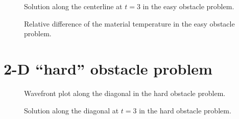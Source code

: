 \begin{figure}[htb]
  \centering
  \label{fig:easymkContour}
\end{figure}

\begin{figure}[htb]
  \centering
  \caption{Solution along the centerline at $t=3$ in the easy obstacle
  problem.}
  \label{fig:easymkCenterline}
\end{figure}

\begin{figure}[htb]
  \centering
  
  \caption{Relative difference of the material temperature in the easy obstacle
  problem.}
  \label{fig:easymkConvergence}
\end{figure}

\section{2-D \texorpdfstring{``hard''}{hard} obstacle problem}

\begin{figure}[htb]
  \centering
  
  \caption{Wavefront plot along the diagonal in the hard obstacle problem.}
  \label{fig:hardmkContour}
\end{figure}

\begin{figure}[htb]
  \centering
  \caption{Solution along the diagonal at $t=3$ in the hard obstacle problem.}
  \label{fig:hardmkCenterline}
\end{figure}

